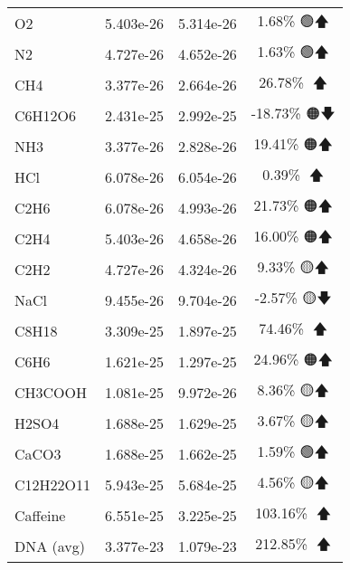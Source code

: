 \begin{longtable}{|l|c|c|c|}
O2 & 5.403e-26 & 5.314e-26 & 1.68\% 🟢🡅 \\
N2 & 4.727e-26 & 4.652e-26 & 1.63\% 🟢🡅 \\
CH4 & 3.377e-26 & 2.664e-26 & 26.78\% 🔴🡅 \\
C6H12O6 & 2.431e-25 & 2.992e-25 & -18.73\% 🟠🡇 \\
NH3 & 3.377e-26 & 2.828e-26 & 19.41\% 🟠🡅 \\
HCl & 6.078e-26 & 6.054e-26 & 0.39\% 🩷🡅 \\
C2H6 & 6.078e-26 & 4.993e-26 & 21.73\% 🟠🡅 \\
C2H4 & 5.403e-26 & 4.658e-26 & 16.00\% 🟠🡅 \\
C2H2 & 4.727e-26 & 4.324e-26 & 9.33\% 🟡🡅 \\
NaCl & 9.455e-26 & 9.704e-26 & -2.57\% 🟡🡇 \\
C8H18 & 3.309e-25 & 1.897e-25 & 74.46\% 🔴🡅 \\
C6H6 & 1.621e-25 & 1.297e-25 & 24.96\% 🟠🡅 \\
CH3COOH & 1.081e-25 & 9.972e-26 & 8.36\% 🟡🡅 \\
H2SO4 & 1.688e-25 & 1.629e-25 & 3.67\% 🟡🡅 \\
CaCO3 & 1.688e-25 & 1.662e-25 & 1.59\% 🟢🡅 \\
C12H22O11 & 5.943e-25 & 5.684e-25 & 4.56\% 🟡🡅 \\
Caffeine & 6.551e-25 & 3.225e-25 & 103.16\% 🔴🡅 \\
DNA (avg) & 3.377e-23 & 1.079e-23 & 212.85\% 🔴🡅 \\
\end{longtable}
